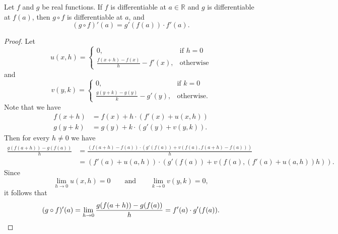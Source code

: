 \begin{theorem}
  Let $f$ and $g$ be real functions.
  If $f$ is differentiable at $a \in \mathbb{R}$ and $g$ is differentiable at
  $f(a)$, then $g \circ f$ is differentiable at $a$, and
  \begin{equation*}
    (g \circ f)'(a) = g'(f(a)) \cdot f'(a).
  \end{equation*}
\end{theorem}
\begin{proof}
  Let
  \begin{equation*}
    u(x, h) =
    \begin{cases}
      0, &\text{if $h = 0$} \\[0.5em]
      \displaystyle \frac{f(x + h) - f(x)}{h} - f'(x), &\text{otherwise}
    \end{cases}
  \end{equation*}
  and
  \begin{equation*}
    v(y, k) =
    \begin{cases}
      0, &\text{if $k = 0$} \\[0.5em]
      \displaystyle \frac{g(y + k) - g(y)}{k} - g'(y), &\text{otherwise}.
    \end{cases}
  \end{equation*}
  Note that we have
  \begin{align*}
    f(x + h) &= f(x) + h \cdot (f'(x) + u(x, h)) \\
    g(y + k) &= g(y) + k \cdot (g'(y) + v(y, k)).
  \end{align*}
  Then for every $h \neq 0$ we have
  \begin{align*}
    \frac{g(f(a + h)) - g(f(a))}{h}
    &= \frac{(f(a + h) - f(a)) \cdot (g'(f(a)) + v(f(a), f(a + h) - f(a)))}{h}
    \\
    &= (f'(a) + u(a, h)) \cdot (g'(f(a)) + v(f(a), (f'(a) + u(a, h))h)).
  \end{align*}
  Since
  \begin{equation*}
    \lim_{h \to 0} u(x, h) = 0
    \qquad \text{and} \qquad
    \lim_{k \to 0} v(y, k) = 0,
  \end{equation*}
  it follows that
  \begin{equation*}
    (g \circ f)'(a)
    = \lim_{h \to 0} \frac{g(f(a + h)) - g(f(a))}{h}
    = f'(a) \cdot g'(f(a)).
    \qedhere
  \end{equation*}
\end{proof}

